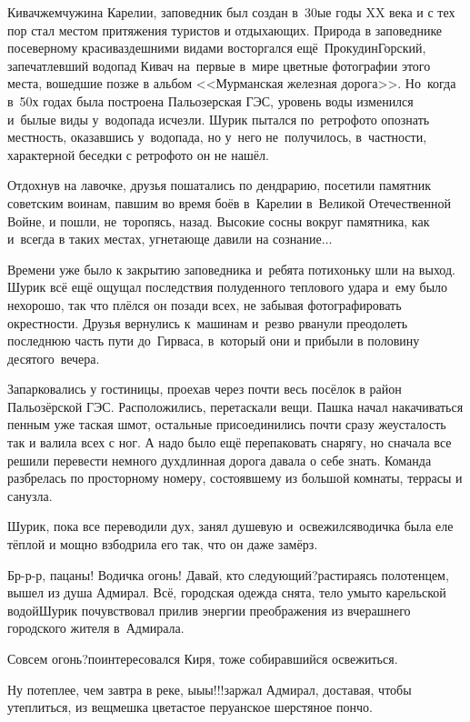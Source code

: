 Кивач\mdash жемчужина Карелии, заповедник был создан в~30\sdash ые годы XX века и с тех пор стал местом притяжения туристов и отдыхающих. Природа в заповеднике по\sdash северному красива\mdash здешними видами восторгался ещё~Прокудин\sdash Горский, запечатлевший водопад Кивач на~первые в~мире цветные фотографии этого места, вошедшие позже в альбом <<Мурманская железная дорога>>. Но~когда в~50\sdash х годах была построена Пальозерская ГЭС, уровень воды изменился и~былые виды у~водопада исчезли. Шурик пытался по~ретро\sdash фото\cite{ПрокудинГорский} опознать местность, оказавшись у~водопада, но у~него не~получилось, в~частности, характерной беседки с ретро\sdash фото он не нашёл.

Отдохнув на лавочке, друзья пошатались по дендрарию, посетили памятник советским воинам, павшим во время боёв в~Карелии в~Великой Отечественной Войне, и пошли, не~торопясь, назад. Высокие сосны вокруг памятника, как и~всегда в таких местах, угнетающе давили на сознание$\ldots$ 

Времени уже было к закрытию заповедника и~ребята потихоньку шли на выход. Шурик всё ещё ощущал последствия полуденного теплового удара и~ему было нехорошо, так что плёлся он позади всех, не забывая фотографировать окрестности. Друзья вернулись к~машинам и~резво рванули преодолеть последнюю часть пути до~Гирваса, в~который они и прибыли в половину десятого~вечера.

Запарковались у гостиницы, проехав через почти весь посёлок в район Пальозёрской ГЭС. Расположились, перетаскали вещи. Пашка начал накачиваться пенным уже таская шмот, остальные присоединились почти сразу же\mdash усталость так и валила всех с ног. А надо было ещё перепаковать снарягу, но сначала все решили перевести немного дух\mdash длинная дорога давала о себе знать. Команда разбрелась по просторному номеру, состоявшему из большой комнаты, террасы и санузла. 

\newpage
Шурик, пока все переводили дух, занял душевую и~освежился\mdash водичка была еле тёплой и мощно взбодрила его так, что он даже замёрз.

\diagdash Бр-р-р, пацаны! Водичка огонь! Давай, кто следующий?\mdash растираясь полотенцем, вышел из душа Адмирал. Всё, городская одежда снята, тело умыто карельской водой\mdash Шурик почувствовал прилив энергии преображения из вчерашнего городского жителя в~Адмирала.

\diagdash Совсем огонь?\mdash поинтересовался Киря, тоже собиравшийся освежиться.

\diagdash Ну потеплее, чем завтра в реке, ы\sdash ы\sdash ы!!!\mdash заржал Адмирал, доставая, чтобы утеплиться, из вещмешка цветастое перуанское шерстяное пончо.

